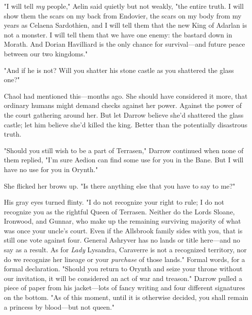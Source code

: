 "I will tell \emph{my} people," Aelin said quietly but not weakly, "the entire truth. 
I will show them the scars on my back from Endovier, the scars on my body from my years as Celaena Sardothien, and I will tell them that the new King of Adarlan is not a monster. 
I will tell them that we have one enemy: the bastard down in Morath. 
And Dorian Havilliard is the only chance for survival---and future peace between our two kingdoms."

"And if he is not?
Will you shatter his stone castle as you shattered the glass one?"

Chaol had mentioned this---months ago. 
She should have considered it more, that ordinary humans might demand checks against her power. 
Against the power of the court gathering around her. 
But let Darrow believe she'd shattered the glass castle; let him believe she'd killed the king. 
Better than the potentially disastrous truth.

"Should you still wish to be a part of Terrasen," Darrow continued when none of them replied, "I'm sure Aedion can find some use for you in the Bane. 
But I will have no use for you in Orynth."

She flicked her brows up. 
"Is there anything else that you have to say to me?"

His gray eyes turned flinty. 
"I do not recognize your right to rule; I do not recognize you as the rightful Queen of Terrasen. 
Neither do the Lords Sloane, Ironwood, and Gunnar, who make up the remaining surviving majority of what was once your uncle's court. 
Even if the Allsbrook family sides with you, that is still one vote against four. 
General Ashryver has no lands or title here---and no say as a result. 
As for \emph{Lady} Lysandra, Caraverre is not a recognized territory, nor do we recognize her lineage or your \emph{purchase} of those lands." 
Formal words, for a formal declaration. 
"Should you return to Orynth and seize your throne without our invitation, it will be considered an act of war and treason." 
Darrow pulled a piece of paper from his jacket---lots of fancy writing and four different signatures on the bottom. 
"As of this moment, until it is otherwise decided, you shall remain a princess by blood---but not queen."
